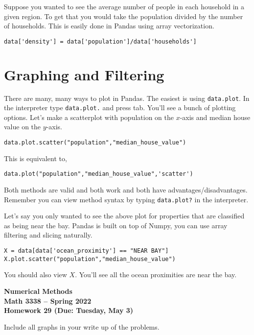 \documentclass[11pt,letterpaper]{article}
\newcommand{\semester}{Spring 2022}
\newcommand{\due}{Tuesday, May 3}
\begin{document}
Suppose you wanted to see the average number of people in each household in a given region.
To get that you would take the population divided by the number of households. This is easily
done in Pandas using array vectorization.
\begin{verbatim}
data['density'] = data['population']/data['households']
\end{verbatim}




\section{Graphing and Filtering}
There are many, many ways to plot in Pandas. The easiest is using \texttt{data.plot}. In the
interpreter type \texttt{data.plot.} and press tab. You'll see a bunch of plotting options. 
Let's make a scatterplot with population on the $x$-axis and median house value on the 
$y$-axis.
\begin{verbatim}
data.plot.scatter("population","median_house_value")
\end{verbatim}
This is equivalent to,
\begin{verbatim}
data.plot("population","median_house_value",'scatter')
\end{verbatim}
Both methods are valid and both work and both have advantages/disadvantages. Remember you can
view method syntax by typing \texttt{data.plot?} in the interpreter. 


Let's say you only wanted to see the above plot for properties that are classified as being 
near the bay. Pandas is built on top of Numpy, you can use array filtering and slicing naturally.
\begin{verbatim}
X = data[data['ocean_proximity'] == "NEAR BAY"]
X.plot.scatter("population","median_house_value")
\end{verbatim}
You should also view $X$. You'll see all the ocean proximities are near the bay.




\newpage

\begin{center}
{\huge{\bf  Numerical Methods}} \\[1.5ex]
{\bf Math 3338 -- \semester}\\[1.5ex]
{\Large{\bf Homework 29 (Due: \due)}}\\
\end{center}
\vspace{2mm}

Include all graphs in your write up of the problems.
\end{document}
